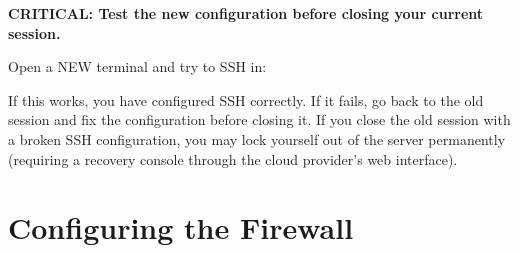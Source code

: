 \begin{codebox}[short]

\begin{Shaded}
\begin{Highlighting}[]
 


  \KeywordTok{|}   
\end{Highlighting}
\end{Shaded}

\end{codebox}

\begin{warnbox}

\textbf{CRITICAL: Test the new configuration before closing your current session.}

\end{warnbox}

\noindent{}Open a NEW terminal and try to SSH in:

\begin{codebox}[short]

\begin{Shaded}
\begin{Highlighting}[]
\end{Highlighting}
\end{Shaded}

\end{codebox}

\noindent{}If this works, you have configured SSH correctly. If it fails, go back to the old session and fix the configuration before closing it. If you close the old session with a broken SSH configuration, you may lock yourself out of the server permanently (requiring a recovery console through the cloud provider's web interface).

\setcounter{section}{4}
\section{Configuring the Firewall}\label{21-system-setup:215-configuring-the-firewall}

